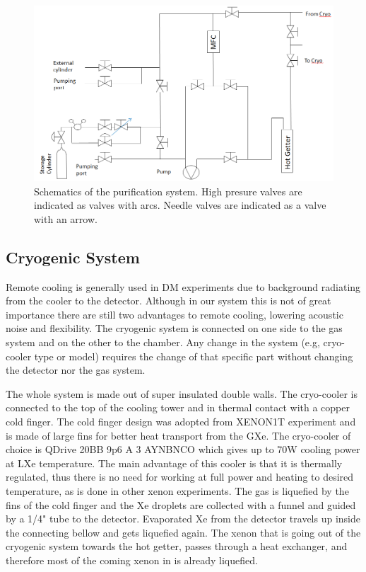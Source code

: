 \begin{figure}[t!]
\centerline{\includegraphics[width=1.\linewidth]{GasSchematics.png}}
\caption{Schematics of the purification system. High presure valves are indicated as valves with arcs. Needle valves are indicated as a valve with an arrow.}
\label{fig:gasSchematic}
\end{figure}
\subsection{Cryogenic System}
\label{subsec:cryo}

Remote cooling is generally used in DM experiments due to background radiating from the cooler to the detector. Although in our system this is not of great importance there are still two advantages to remote cooling, lowering acoustic noise and  flexibility. The cryogenic system is connected on one side to the gas system and on the other to the chamber. Any change in the system (e.g, cryo-cooler type or  model) requires the change of that specific part without changing the detector nor the gas system.

The whole system is made out of super insulated double walls.  The cryo-cooler is connected to the top of the cooling tower and in thermal contact with a copper cold finger. The cold finger design was adopted from XENON1T experiment and is made of large fins for better heat transport from the GXe. The
cryo-cooler of choice is QDrive 20BB 9p6 A 3 AYNBNCO which gives up to 70W
cooling power at LXe temperature. The main advantage of this cooler is that it is thermally regulated, thus there is no need for working at full power and heating to desired temperature, as is done in other xenon experiments.
The gas is liquefied by the fins of the cold finger and the Xe droplets are collected with a funnel and guided by a 1/4" tube to the detector. Evaporated Xe from the detector travels up inside the connecting bellow and gets liquefied again. The xenon that is going out of the cryogenic system towards the hot getter, passes through a heat exchanger, and therefore most of the coming xenon in is already liquefied.

